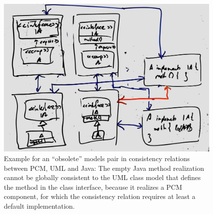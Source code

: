 \begin{figure}
    \centering
    \includegraphics[width=\textwidth]{figures/correctness/compatibility/obsolete_relations_scenario.jpg}
    \caption[Concrete scenario with obsolete relation elements]{Example for an \enquote{obsolete} models pair in consistency relations between \gls{PCM}, UML and Java: The empty Java method realization cannot be globally consistent to the UML class model that defines the method in the class interface, because it realizes a \gls{PCM} component, for which the consistency relation requires at least a default implementation.}
    \label{fig:compatibility:obsolete_relations_scenario}
\end{figure}

